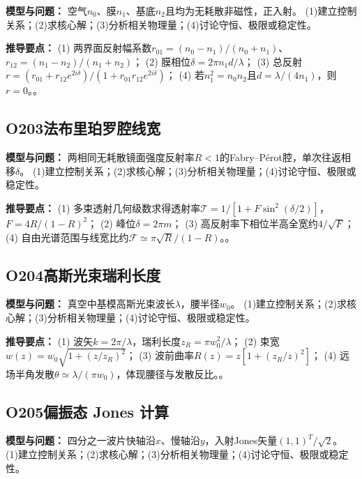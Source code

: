 \textbf{模型与问题：} 空气$n_0$、膜$n_1$、基底$n_2$且均为无耗散非磁性，正入射。 (1)建立控制关系；(2)求核心解；(3)分析相关物理量；(4)讨论守恒、极限或稳定性。

\par\textbf{推导要点：} (1) 两界面反射幅系数$r_{01}=(n_0-n_1)/(n_0+n_1)$、$r_{12}=(n_1-n_2)/(n_1+n_2)$； (2) 膜相位$\delta=2\pi n_1d/\lambda$； (3) 总反射$r=(r_{01}+r_{12}e^{2i\delta})/(1+r_{01}r_{12}e^{2i\delta})$； (4) 若$n_1^2=n_0n_2$且$d=\lambda/(4n_1)$，则$r=0$。。

\par\medskip

\subsection*{O203\quad 法布里珀罗腔线宽}

\textbf{模型与问题：} 两相同无耗散镜面强度反射率$R<1$的Fabry–Pérot腔，单次往返相移$\delta$。 (1)建立控制关系；(2)求核心解；(3)分析相关物理量；(4)讨论守恒、极限或稳定性。

\par\textbf{推导要点：} (1) 多束透射几何级数求得透射率$\mathcal T=1/[1+F\sin^2(\delta/2)]$，$F=4R/(1-R)^2$； (2) 峰位$\delta=2\pi m$； (3) 高反射率下相位半高全宽约$4/\sqrt F$； (4) 自由光谱范围与线宽比约$\mathcal F\simeq\pi\sqrt R/(1-R)$。。

\par\medskip

\subsection*{O204\quad 高斯光束瑞利长度}

\textbf{模型与问题：} 真空中基模高斯光束波长$\lambda$，腰半径$w_0$。 (1)建立控制关系；(2)求核心解；(3)分析相关物理量；(4)讨论守恒、极限或稳定性。

\par\textbf{推导要点：} (1) 波矢$k=2\pi/\lambda$，瑞利长度$z_R=\pi w_0^2/\lambda$； (2) 束宽$w(z)=w_0\sqrt{1+(z/z_R)^2}$； (3) 波前曲率$R(z)=z[1+(z_R/z)^2]$； (4) 远场半角发散$\theta\simeq\lambda/(\pi w_0)$，体现腰径与发散反比。。

\par\medskip

\subsection*{O205\quad 偏振态 Jones 计算}

\textbf{模型与问题：} 四分之一波片快轴沿$x$、慢轴沿$y$，入射Jones矢量$(1,1)^T/\sqrt2$。 (1)建立控制关系；(2)求核心解；(3)分析相关物理量；(4)讨论守恒、极限或稳定性。

